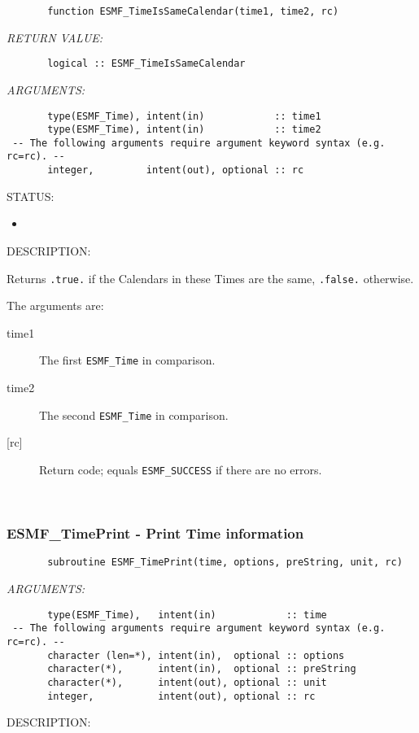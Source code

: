  
\begin{verbatim}       function ESMF_TimeIsSameCalendar(time1, time2, rc)
 \end{verbatim}{\em RETURN VALUE:}
\begin{verbatim}       logical :: ESMF_TimeIsSameCalendar
 \end{verbatim}{\em ARGUMENTS:}
\begin{verbatim}       type(ESMF_Time), intent(in)            :: time1
       type(ESMF_Time), intent(in)            :: time2
 -- The following arguments require argument keyword syntax (e.g. rc=rc). --
       integer,         intent(out), optional :: rc
 \end{verbatim}
{\sf STATUS:}
   \begin{itemize}
   \item{}
   \end{itemize}
  
{\sf DESCRIPTION:\\ }


       Returns {\tt .true.} if the Calendars in these Times are
       the same, {\tt .false.} otherwise.
  
       The arguments are:
       \begin{description}
       \item[time1]
            The first {\tt ESMF\_Time} in comparison.
       \item[time2]
            The second {\tt ESMF\_Time} in comparison.
       \item[{[rc]}]
            Return code; equals {\tt ESMF\_SUCCESS} if there are no errors.
       \end{description}
   
 
\mbox{}\hrulefill\ 
 
\subsubsection [ESMF\_TimePrint] {ESMF\_TimePrint - Print Time information}


 
\begin{verbatim}       subroutine ESMF_TimePrint(time, options, preString, unit, rc)
 \end{verbatim}{\em ARGUMENTS:}
\begin{verbatim}       type(ESMF_Time),   intent(in)            :: time
 -- The following arguments require argument keyword syntax (e.g. rc=rc). --
       character (len=*), intent(in),  optional :: options
       character(*),      intent(in),  optional :: preString
       character(*),      intent(out), optional :: unit
       integer,           intent(out), optional :: rc
 \end{verbatim}
{\sf DESCRIPTION:\\ }



